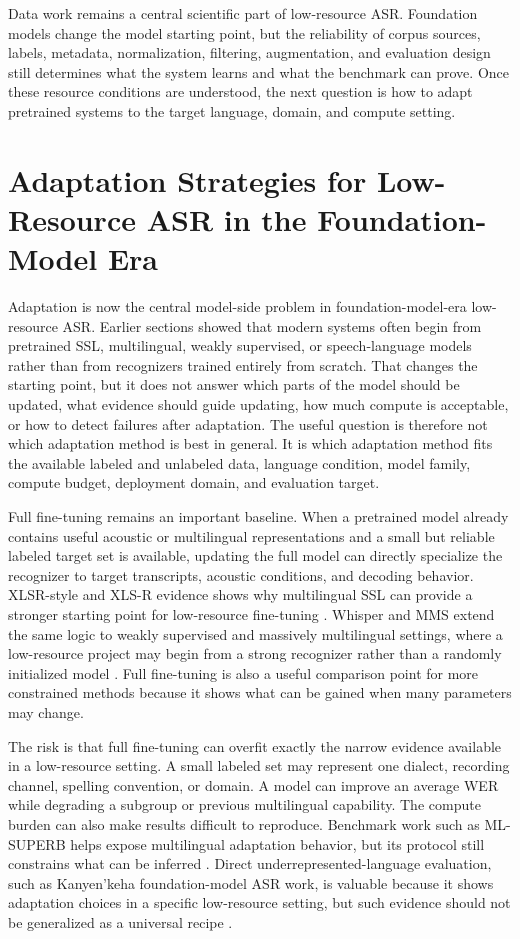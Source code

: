 \documentclass[pdflatex,sn-basic,iicol]{sn-jnl}
\theoremstyle{thmstyleone}
\theoremstyle{thmstyletwo}
\theoremstyle{thmstylethree}
\begin{document}
Data work remains a central scientific part of low-resource ASR. Foundation models change the model starting point, but the reliability of corpus sources, labels, metadata, normalization, filtering, augmentation, and evaluation design still determines what the system learns and what the benchmark can prove. Once these resource conditions are understood, the next question is how to adapt pretrained systems to the target language, domain, and compute setting.

\section{Adaptation Strategies for Low-Resource ASR in the Foundation-Model Era}

Adaptation is now the central model-side problem in foundation-model-era low-resource ASR. Earlier sections showed that modern systems often begin from pretrained SSL, multilingual, weakly supervised, or speech-language models rather than from recognizers trained entirely from scratch. That changes the starting point, but it does not answer which parts of the model should be updated, what evidence should guide updating, how much compute is acceptable, or how to detect failures after adaptation. The useful question is therefore not which adaptation method is best in general. It is which adaptation method fits the available labeled and unlabeled data, language condition, model family, compute budget, deployment domain, and evaluation target.

Full fine-tuning remains an important baseline. When a pretrained model already contains useful acoustic or multilingual representations and a small but reliable labeled target set is available, updating the full model can directly specialize the recognizer to target transcripts, acoustic conditions, and decoding behavior. XLSR-style and XLS-R evidence shows why multilingual SSL can provide a stronger starting point for low-resource fine-tuning \citep{conneau21_interspeech,babu22_interspeech}. Whisper and MMS extend the same logic to weakly supervised and massively multilingual settings, where a low-resource project may begin from a strong recognizer rather than a randomly initialized model \citep{pmlr-v202-radford23a,pratap2024mms}. Full fine-tuning is also a useful comparison point for more constrained methods because it shows what can be gained when many parameters may change.

The risk is that full fine-tuning can overfit exactly the narrow evidence available in a low-resource setting. A small labeled set may represent one dialect, recording channel, spelling convention, or domain. A model can improve an average WER while degrading a subgroup or previous multilingual capability. The compute burden can also make results difficult to reproduce. Benchmark work such as ML-SUPERB helps expose multilingual adaptation behavior, but its protocol still constrains what can be inferred \citep{shi2023mlsuperb}. Direct underrepresented-language evaluation, such as Kanyen'keha foundation-model ASR work, is valuable because it shows adaptation choices in a specific low-resource setting, but such evidence should not be generalized as a universal recipe \citep{geng25c_interspeech}.
\end{document}
